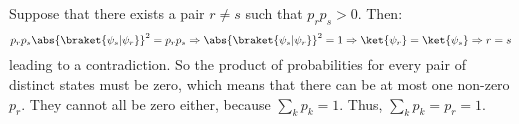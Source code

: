 %
Suppose that there exists a pair $r \ne s$ such that $p_r p_s > 0$. Then:
%
$$
p_r p_s \abs{\braket{\psi_s|\psi_r}}^2 = p_r p_s \Rightarrow
\abs{\braket{\psi_s|\psi_r}}^2 = 1 \Rightarrow \ket{\psi_r} = \ket{\psi_s}
\Rightarrow r = s
$$
%
leading to a contradiction.
%
So the product of probabilities for every pair of distinct states must be zero, which means that there can be at most one non-zero $p_r$.
%
They cannot all be zero either, because $\sum_k{p_k} = 1$.
%
Thus, $\sum_k{p_k} = p_r = 1$.
\endgroup
